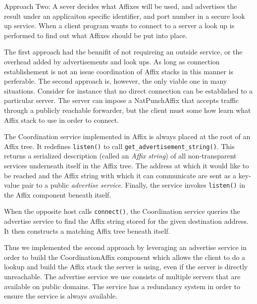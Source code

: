 Approach Two: A sever decides what Affixes will be used, and advertises the result under an applicaiton 
specific identifier, and port number in a secure look up service.  When a client program wants to connect 
to a server a look up is performed to find out what Affixes should be put into place. 

The first approach had the bennifit of not requireing an outside service, or the overhead added 
by advertisements and look ups.  As long as connection establishement is not an issue coordination 
of Affix stacks in this manner is perferable.  The second approach is, however, the only viable one 
in many situations. Consider for instance that no direct connection can be established to a particular server.  
The server can impose a NatPunchAffix that accepts traffic through a publicly reachable forwarder, 
but the client must some how learn what Affix stack to use in order to connect.  
\fi


The Coordination service implemented in Affix is always placed at the root
of an Affix tree. It redefines \texttt{listen()} to call
\texttt{get\_advertisement\_string()}. This returns a serialized description 
(called an \emph{Affix string})
of all non-transparent services underneath itself in the Affix tree.
The address at which it would like to be reached and the Affix string
with which it can communicate are sent as a key-value pair to 
a public \emph{advertise service}. Finally, the service invokes \texttt{listen()}
in the Affix component beneath itself.

When the opposite host calls \texttt{connect()}, the Coordination service 
queries the advertise service to find the Affix string stored for the 
given destination address. It then constructs a matching Affix tree beneath itself.




\iffalse
Thus we implemented the second approach by leveraging an advertise service in order to
build the CoordinationAffix component which allows the client to do a lookup and build the
Affix stack the server is using, even if the server is directly unreachable. The advertise
service we use consists of multiple servers that are available on public domains. The service
has a redundancy system in order to ensure the service is always available.

